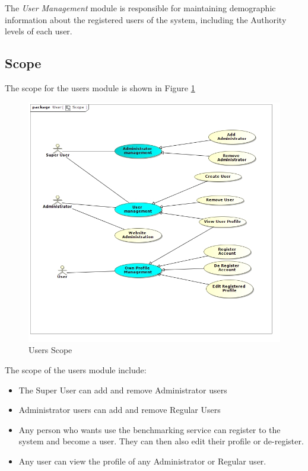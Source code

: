 The \textit{User Management} module is responsible for maintaining demographic information
about the registered users of the system, including the Authority levels of each
user.

\subsection{Scope}
The scope for the users module is shown in Figure \ref{Users Scope}
\begin{figure}[H]
  \begin{center}
  \includegraphics[scale=0.5]{../Diagrams and Charts/Users/Scope.jpg}
  \caption{Users Scope}
  \end{center}
  \label{Users Scope}
\end{figure}
The scope of the users module include:
\begin{itemize}
	\item The Super User can add and remove Administrator users
	\item Administrator users can add and remove Regular Users
	\item Any person who wants use the benchmarking service can register
	to the system and become a user. They can then also edit
	their profile or de-register.
	\item Any user can view the profile of any Administrator or Regular
	user.
\end{itemize}

